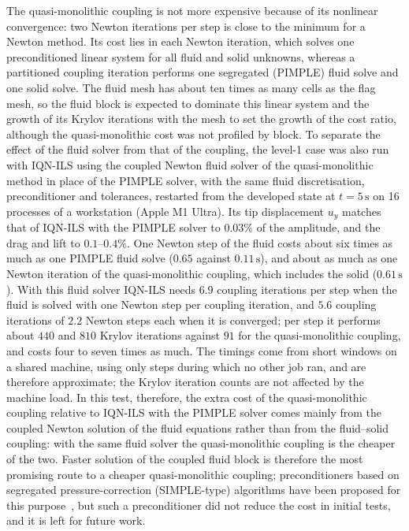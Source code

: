 The quasi-monolithic coupling is not more expensive because of its nonlinear convergence: two Newton iterations per step is close to the minimum for a Newton method.
Its cost lies in each Newton iteration, which solves one preconditioned linear system for all fluid and solid unknowns, whereas a partitioned coupling iteration performs one segregated (PIMPLE) fluid solve and one solid solve.
The fluid mesh has about ten times as many cells as the flag mesh, so the fluid block is expected to dominate this linear system and the growth of its Krylov iterations with the mesh to set the growth of the cost ratio, although the quasi-monolithic cost was not profiled by block.
To separate the effect of the fluid solver from that of the coupling, the level-1 case was also run with IQN-ILS using the coupled Newton fluid solver of the quasi-monolithic method in place of the PIMPLE solver, with the same fluid discretisation, preconditioner and tolerances, restarted from the developed state at $t = 5\,\mathrm{s}$ on 16 processes of a workstation (Apple M1 Ultra).
Its tip displacement $u_y$ matches that of IQN-ILS with the PIMPLE solver to $0.03\%$ of the amplitude, and the drag and lift to $0.1$--$0.4\%$.
One Newton step of the fluid costs about six times as much as one PIMPLE fluid solve ($0.65$ against $0.11\,\mathrm{s}$), and about as much as one Newton iteration of the quasi-monolithic coupling, which includes the solid ($0.61\,\mathrm{s}$).
With this fluid solver IQN-ILS needs $6.9$ coupling iterations per step when the fluid is solved with one Newton step per coupling iteration, and $5.6$ coupling iterations of $2.2$ Newton steps each when it is converged; per step it performs about $440$ and $810$ Krylov iterations against $91$ for the quasi-monolithic coupling, and costs four to seven times as much.
The timings come from short windows on a shared machine, using only steps during which no other job ran, and are therefore approximate; the Krylov iteration counts are not affected by the machine load.
In this test, therefore, the extra cost of the quasi-monolithic coupling relative to IQN-ILS with the PIMPLE solver comes mainly from the coupled Newton solution of the fluid equations rather than from the fluid--solid coupling: with the same fluid solver the quasi-monolithic coupling is the cheaper of the two.
Faster solution of the coupled fluid block is therefore the most promising route to a cheaper quasi-monolithic coupling; preconditioners based on segregated pressure-correction (SIMPLE-type) algorithms have been proposed for this purpose~\citep{Pernice2001, Knoll2004, Klaij2013}, but such a preconditioner did not reduce the cost in initial tests, and it is left for future work.


